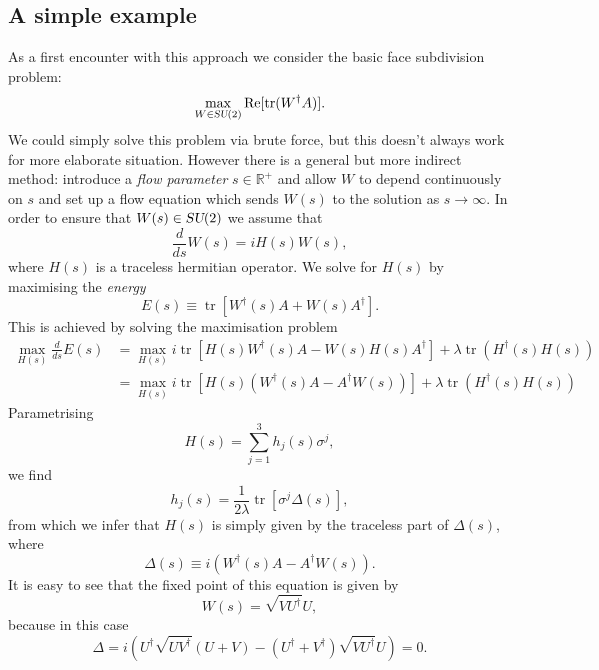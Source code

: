 \documentclass[12pt]{amsart}
\newcommand{\tr}{\operatorname{tr}}
\def\su2{\textsl{SU}(2)}
\theoremstyle{definition}
\theoremstyle{remark}
\numberwithin{equation}{section}
\begin{document}
\subsection{A simple example}
As a first encounter with this approach we consider the basic face subdivision problem:
\begin{equation}
	\max_{W\in \su2} \text{Re}[\tr(W^\dag A)].
\end{equation}
We could simply solve this problem via brute force, but this doesn't always work for more elaborate situation. However there is a general but more indirect method: introduce a \emph{flow parameter} $s \in \mathbb{R}^+$ and allow $W$ to depend continuously on $s$ and set up a flow equation which sends $W(s)$ to the solution as $s\rightarrow \infty$. In order to ensure that $W(s)\in\su2$ we assume that 
\begin{equation}\label{eq:wilsonflow}
	\frac{d}{ds} W(s) = i H(s) W(s),
\end{equation}
where $H(s)$ is a traceless hermitian operator. We solve for $H(s)$ by maximising the \emph{energy}
\begin{equation}
	E(s) \equiv \tr\left[W^\dag(s)A + W(s) A^\dag\right].
\end{equation}
This is achieved by solving the maximisation problem
\begin{equation}
	\begin{split}
	\max_{H(s)} \frac{d}{ds}E(s) &= \max_{H(s)} i\tr\left[H(s)W^\dag(s)A - W(s)H(s) A^\dag\right] + \lambda \tr(H^\dag(s)H(s)) \\ 
	&= \max_{H(s)} i\tr\left[H(s)(W^\dag(s)A - A^\dag W(s))\right]+ \lambda \tr(H^\dag(s)H(s))
	\end{split}
\end{equation}
Parametrising
\begin{equation}
	H(s) = \sum_{j=1}^3 h_j(s)\sigma^j,
\end{equation}
we find
\begin{equation}
	h_j(s) = \frac{1}{2\lambda} \tr\left[\sigma^j\Delta(s)\right],
\end{equation}
from which we infer that $H(s)$ is simply given by the traceless part of $\Delta(s)$, where
\begin{equation}
	\Delta(s) \equiv i(W^\dag(s)A - A^\dag W(s)).
\end{equation}
It is easy to see that the fixed point of this equation is given by
\begin{equation}
	W(s) = \sqrt{VU^\dag} U,
\end{equation}
because in this case
\begin{equation}
	\Delta = i\left( U^\dag \sqrt{U V^\dag}(U+V) - (U^\dag + V^\dag) \sqrt{VU^\dag} U \right) = 0.
\end{equation}
\end{document}
